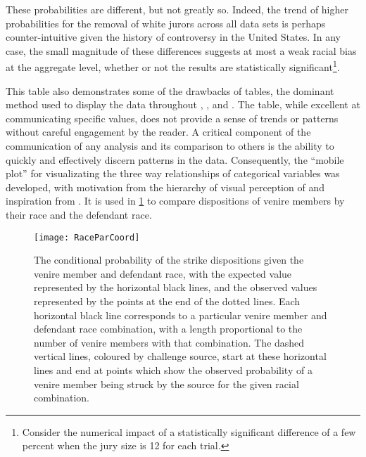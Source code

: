 These probabilities are different, but not greatly so. Indeed, the trend of higher probabilities for the removal of white jurors
across all data sets is perhaps counter-intuitive given the history of controversy in the United States. In any case, the small
magnitude of these differences suggests at most a weak racial bias at the aggregate level, whether or not the
results are statistically significant\footnote{Consider the numerical impact of a statistically significant difference of a few
  percent when the jury size is 12 for each trial.}.

This table also demonstrates some of the drawbacks of tables, the dominant method used to display the data throughout
\cite{JurySunshineProj}, \cite{StubbornLegacy}, and \cite{PerempChalMurder}. The table, while excellent at communicating specific
values, does not provide a sense of trends or patterns without careful engagement by the reader. A critical component of the
communication of any analysis and its comparison to others is the ability to quickly and effectively discern patterns in the data. Consequently, the ``mobile plot'' for visualizating the three way relationships of categorical variables was
developed, with motivation from the hierarchy of visual perception of \cite{cleveland1987} and inspiration from \cite{VisualDisplayQuant}. It is used in \ref{fig:racedefmob} to compare dispositions of venire members by their race and the defendant race.

\begin{figure}[!h]
  \centering
  \texttt{[image: RaceParCoord]}
  \caption[The ``Mobile Plot'' of Strikes by Racial Combination (Sunshine)]{\footnotesize The conditional probability of the strike dispositions given the
    venire member and defendant race, with the expected value represented by the horizontal black lines, and the observed values
    represented by the points at the end of the dotted lines. Each horizontal black line corresponds to a particular venire member
    and defendant race combination, with a length proportional to the number of venire members with that combination. The dashed
    vertical lines, coloured by challenge source, start at these horizontal lines and end at points which show the observed
    probability of a venire member being struck by the source for the given racial combination.}
  \label{fig:racedefmob}
\end{figure}

